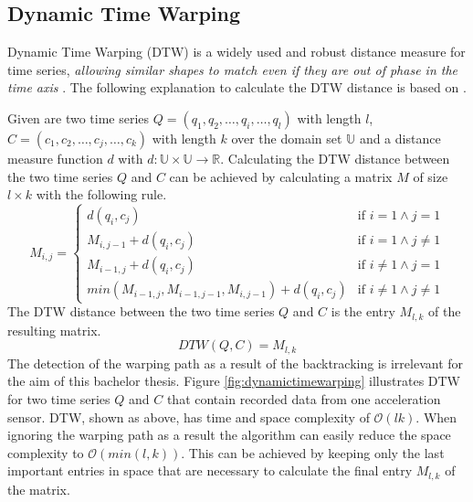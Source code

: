 \subsection{Dynamic Time Warping} \label{dynamic_time_warping}
Dynamic Time Warping (DTW) is a widely used and robust distance measure for time series, \textit{allowing similar shapes
to match even if they are out of phase in the time axis} \cite{keogh2002exact}. The following explanation to calculate
the DTW distance is based on \cite{sart2010accelerating}.

Given are two time series $Q = (q_1,\allowbreak q_2,\allowbreak \dots,\allowbreak q_i,\allowbreak \dots,\allowbreak q_l)$
with length $l$, $C = (c_1,\allowbreak c_2,\allowbreak \dots,\allowbreak c_j,\allowbreak \dots,\allowbreak c_k)$ with
length $k$ over the domain set $\mathbb{U}$ and a distance measure function $d$ with
$d: \mathbb{U} \times \mathbb{U} \to \mathbb{R}$. Calculating the DTW distance between the two time series $Q$ and $C$
can be achieved by calculating a matrix $M$ of size $l \times k$ with the following rule.
\begin{equation} \label{eq:dtw}
    M_{i, j} = \begin{cases}
        d(q_i,c_j) & \text{if } i = 1 \wedge j = 1\\
        M_{i,j-1} + d(q_i,c_j) & \text{if } i = 1 \wedge j \neq 1\\
        M_{i-1,j} + d(q_i,c_j) & \text{if } i \neq 1 \wedge j = 1\\
        min(M_{i-1,j}, M_{i-1,j-1}, M_{i,j-1}) + d(q_i,c_j) & \text{if } i \neq 1 \wedge j \neq 1
    \end{cases}
\end{equation}
The DTW distance between the two time series $Q$ and $C$ is the entry $M_{l,k}$ of the resulting matrix.
\begin{equation}
    DTW(Q, C) = M_{l,k}
\end{equation}
The detection of the warping path as a result of the backtracking is irrelevant for the aim of this bachelor thesis.
Figure \ref{fig:dynamictimewarping} illustrates DTW for two time series $Q$ and $C$ that contain recorded data from one
acceleration sensor. DTW, shown as above, has time and space complexity of $\mathcal{O}(lk)$. When ignoring the
warping path as a result the algorithm can easily reduce the space complexity to $\mathcal{O}(min(l, k))$. This can be
achieved by keeping only the last important entries in space that are necessary to calculate the final entry $M_{l,k}$
of the matrix.

